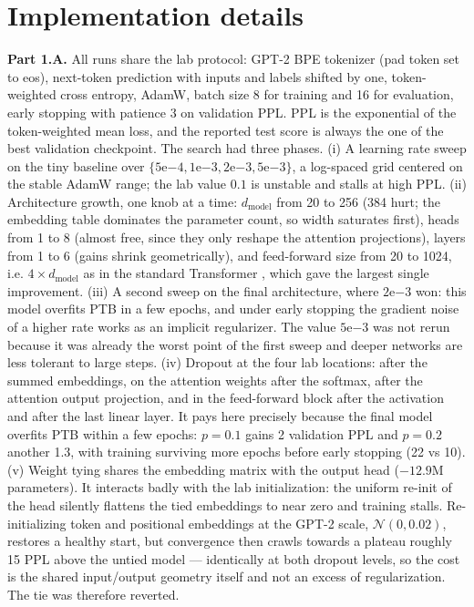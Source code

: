 \documentclass[a4paper]{article}
\begin{document}
\section{Implementation details}
\textbf{Part 1.A.} All runs share the lab protocol: GPT-2 BPE tokenizer (pad token set to eos), next-token prediction with inputs and labels shifted by one, token-weighted cross entropy, AdamW, batch size 8 for training and 16 for evaluation, early stopping with patience 3 on validation PPL. PPL is the exponential of the token-weighted mean loss, and the reported test score is always the one of the best validation checkpoint. The search had three phases. (i) A learning rate sweep on the tiny baseline over $\{5\mathrm{e}{-4}, 1\mathrm{e}{-3}, 2\mathrm{e}{-3}, 5\mathrm{e}{-3}\}$, a log-spaced grid centered on the stable AdamW range; the lab value $0.1$ is unstable and stalls at high PPL. (ii) Architecture growth, one knob at a time: $d_{\mathrm{model}}$ from 20 to 256 (384 hurt; the embedding table dominates the parameter count, so width saturates first), heads from 1 to 8 (almost free, since they only reshape the attention projections), layers from 1 to 6 (gains shrink geometrically), and feed-forward size from 20 to 1024, i.e. $4 \times d_{\mathrm{model}}$ as in the standard Transformer \cite{vaswani2017attention}, which gave the largest single improvement. (iii) A second sweep on the final architecture, where $2\mathrm{e}{-3}$ won: this model overfits PTB in a few epochs, and under early stopping the gradient noise of a higher rate works as an implicit regularizer. The value $5\mathrm{e}{-3}$ was not rerun because it was already the worst point of the first sweep and deeper networks are less tolerant to large steps. (iv) Dropout \cite{srivastava2014dropout} at the four lab locations: after the summed embeddings, on the attention weights after the softmax, after the attention output projection, and in the feed-forward block after the activation and after the last linear layer. It pays here precisely because the final model overfits PTB within a few epochs: $p{=}0.1$ gains 2 validation PPL and $p{=}0.2$ another 1.3, with training surviving more epochs before early stopping (22 vs 10). (v) Weight tying \cite{press2017tying} shares the embedding matrix with the output head ($-12.9$M parameters). It interacts badly with the lab initialization: the uniform re-init of the head silently flattens the tied embeddings to near zero and training stalls. Re-initializing token and positional embeddings at the GPT-2 scale, $\mathcal{N}(0, 0.02)$, restores a healthy start, but convergence then crawls towards a plateau roughly 15 PPL above the untied model --- identically at both dropout levels, so the cost is the shared input/output geometry itself and not an excess of regularization. The tie was therefore reverted.
\end{document}
